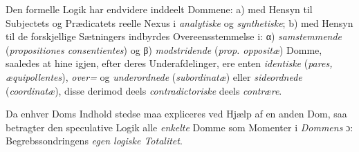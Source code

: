 \documentclass[12pt]{book}
\newcommand{\dsi}{\textup{ɔ:}}
\newcommand{\opage}[1]{\marginnote{\footnotesize\textit{[#1]}}}
\begin{document}
Den formelle Logik har endvidere inddeelt Dommene: a) med Hensyn til Subjectets og
Prædicatets
\opage{56} %
reelle Nexus i \emph{analytiske} og \emph{synthetiske}; b) med Hensyn til de
forskjellige Sætningers indbyrdes Overeensstemmelse i: α) \emph{samstemmende}
(\textit{propositiones consentientes}) og β) \emph{modstridende}
(\textit{prop. oppositæ}) Domme, saaledes at hine igjen, efter deres
Underafdelinger, ere enten \emph{identiske} (\textit{pares, æquipollentes}),
\emph{over=} og \emph{underordnede} (\textit{subordinatæ}) eller
\emph{sideordnede} (\textit{coordinatæ}), disse derimod deels
\emph{contradictoriske} deels \emph{contrære}.

Da enhver Doms Indhold stedse maa expliceres ved Hjælp af en anden Dom, saa
betragter den speculative Logik alle \emph{enkelte} Domme som Momenter i
\emph{Dommens} \dsi{} Begrebssondringens \emph{egen logiske Totalitet}.
\end{document}
